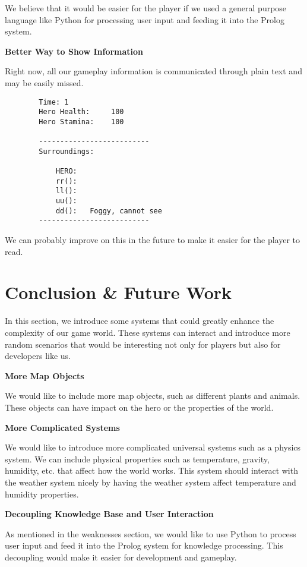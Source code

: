 \documentclass[10pt]{article}
\begin{document}
We believe that it would be easier for the player if we used a general purpose language like Python for processing user input and feeding it into the Prolog system.


\textbf{Better Way to Show Information}

Right now, all our gameplay information is communicated through plain text and may be easily missed.

\begin{verbatim}
        Time: 1
        Hero Health:     100
        Hero Stamina:    100

        --------------------------
        Surroundings:

            HERO:
            rr():
            ll():
            uu():
            dd():   Foggy, cannot see
        --------------------------
\end{verbatim}

We can probably improve on this in the future to make it easier for the player to read.




\section{Conclusion \& Future Work}

In this section, we introduce some systems that could greatly enhance the complexity of our game world. These systems can interact and introduce more random scenarios that would be interesting not only for players but also for developers like us.

\textbf{More Map Objects}

We would like to include more map objects, such as different plants and animals. These objects can have impact on the hero or the properties of the world.

\textbf{More Complicated Systems}

We would like to introduce more complicated universal systems such as a physics system. We can include physical properties such as temperature, gravity, humidity, etc. that affect how the world works. This system should interact with the weather system nicely by having the weather system affect temperature and humidity properties.

\textbf{Decoupling Knowledge Base and User Interaction}

As mentioned in the weaknesses section, we would like to use Python to process user input and feed it into the Prolog system for knowledge processing. This decoupling would make it easier for development and gameplay.






\end{document}

